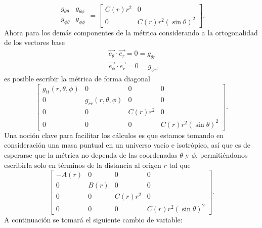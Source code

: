 \begin{equation}
    \begin{array}{ll}
        g_{\theta \theta} & g_{\theta \phi} \\
        g_{\phi \theta}   & g_{\phi \phi}
    \end{array} = \left[\begin{array}{cc}
            C(r) r^2 & 0                       \\
            0        & C(r) r^2(\sin \theta)^2
        \end{array}\right].
\end{equation}
Ahora para los demás componentes de la métrica considerando a la ortogonalidad de los vectores base
\begin{equation}
    \begin{aligned}
         & \overrightarrow{e_\theta} \cdot \overrightarrow{e_r}=0=g_{\theta r} \\
         & \overrightarrow{e_\phi} \cdot \overrightarrow{e_r}=0=g_{\phi r},
    \end{aligned}
\end{equation}
es posible escribir la métrica de forma diagonal
\begin{equation}
    \left[\begin{array}{cccc}
            g_{t t}(r, \theta, \phi) & 0                        & 0        & 0                       \\
            0                        & g_{r r}(r, \theta, \phi) & 0        & 0                       \\
            0                        & 0                        & C(r) r^2 & 0                       \\
            0                        & 0                        & 0        & C(r) r^2(\sin \theta)^2
        \end{array}\right].
\end{equation}
Una noción clave para facilitar los cálculos es que estamos tomando en consideración una masa puntual en un universo vacío e isotrópico, así que es de esperarse que la métrica no dependa de las coordenadas $\theta$ y $\phi$, permitiéndonos escribirla solo en términos de la distancia al origen $r$ tal que
\begin{equation}
    \left[\begin{array}{cccc}
            -A(r) & 0    & 0        & 0                       \\
            0     & B(r) & 0        & 0                       \\
            0     & 0    & C(r) r^2 & 0                       \\
            0     & 0    & 0        & C(r) r^2(\sin \theta)^2
        \end{array}\right].
\end{equation}
A continuación se tomará el siguiente cambio de variable:

